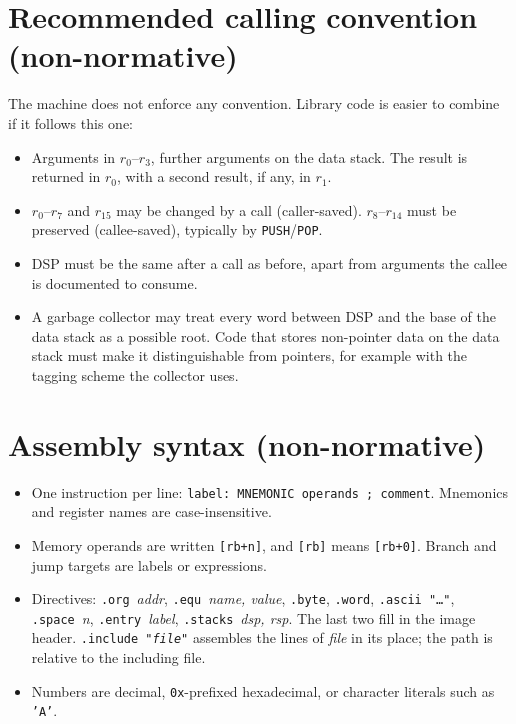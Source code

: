 \documentclass[11pt,a4paper]{article}
\newcommand{\op}[1]{\texttt{#1}}
\newcommand{\R}[1]{r_{#1}}
\begin{document}
\appendix
\section{Recommended calling convention (non-normative)}\label{app:cc}

The machine does not enforce any convention. Library code is easier to
combine if it follows this one:
\begin{itemize}[nosep]
\item Arguments in $\R{0}$--$\R{3}$, further arguments on the data stack.
  The result is returned in $\R{0}$, with a second result, if any, in $\R{1}$.
\item $\R{0}$--$\R{7}$ and $\R{15}$ may be changed by a call (caller-saved).
  $\R{8}$--$\R{14}$ must be preserved (callee-saved), typically by
  \op{PUSH}/\op{POP}.
\item DSP must be the same after a call as before, apart from arguments the
  callee is documented to consume.
\item A garbage collector may treat every word between DSP and the base of
  the data stack as a possible root. Code that stores non-pointer data on
  the data stack must make it distinguishable from pointers, for example
  with the tagging scheme the collector uses.
\end{itemize}

\section{Assembly syntax (non-normative)}\label{app:syntax}

\begin{itemize}[nosep]
\item One instruction per line: \texttt{label:\ MNEMONIC operands ; comment}.
  Mnemonics and register names are case-insensitive.
\item Memory operands are written \texttt{[rb+n]}, and \texttt{[rb]} means
  \texttt{[rb+0]}. Branch and jump targets are labels or expressions.
\item Directives: \texttt{.org}~\emph{addr}, \texttt{.equ}~\emph{name, value},
  \texttt{.byte}, \texttt{.word}, \texttt{.ascii "\dots"}, \texttt{.space}~\emph{n},
  \texttt{.entry}~\emph{label}, \texttt{.stacks}~\emph{dsp, rsp}. The last two
  fill in the image header. \texttt{.include "\emph{file}"} assembles the
  lines of \emph{file} in its place; the path is relative to the including
  file.
\item Numbers are decimal, \texttt{0x}-prefixed hexadecimal, or character
  literals such as \texttt{'A'}.
\end{itemize}
\end{document}
